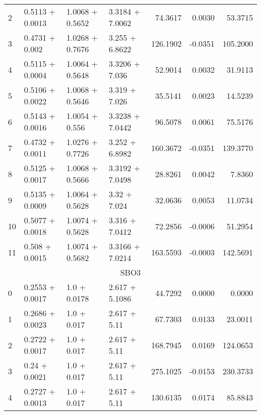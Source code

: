 \begin{tabular}{llllrrr}
  2  &  0.5113 + 0.0013 &  1.0068 + 0.5652 &  3.3184 + 7.0062 &             74.3617 &                 0.0030 &        53.3715 \\
  3  &   0.4731 + 0.002 &  1.0268 + 0.7676 &   3.255 + 6.8622 &            126.1902 &                -0.0351 &       105.2000 \\
  4  &  0.5115 + 0.0004 &  1.0064 + 0.5648 &   3.3206 + 7.036 &             52.9014 &                 0.0032 &        31.9113 \\
  5  &  0.5106 + 0.0022 &  1.0068 + 0.5646 &    3.319 + 7.026 &             35.5141 &                 0.0023 &        14.5239 \\
  6  &  0.5143 + 0.0016 &   1.0054 + 0.556 &  3.3238 + 7.0442 &             96.5078 &                 0.0061 &        75.5176 \\
  7  &  0.4732 + 0.0011 &  1.0276 + 0.7726 &   3.252 + 6.8982 &            160.3672 &                -0.0351 &       139.3770 \\
  8  &  0.5125 + 0.0017 &  1.0068 + 0.5666 &  3.3192 + 7.0498 &             28.8261 &                 0.0042 &         7.8360 \\
  9  &  0.5135 + 0.0009 &  1.0064 + 0.5628 &     3.32 + 7.024 &             32.0636 &                 0.0053 &        11.0734 \\
  10 &  0.5077 + 0.0018 &  1.0074 + 0.5628 &   3.316 + 7.0412 &             72.2856 &                -0.0006 &        51.2954 \\
  11 &   0.508 + 0.0015 &  1.0074 + 0.5682 &  3.3166 + 7.0214 &            163.5593 &                -0.0003 &       142.5691 \\
  \midrule
  \multicolumn{7}{c}{SBO3} \\
  \midrule
  0  &  0.2553 + 0.0017 &  1.0 + 0.0178 &  2.617 + 5.1086 &             44.7292 &                 0.0000 &         0.0000 \\
  1  &  0.2686 + 0.0023 &   1.0 + 0.017 &    2.617 + 5.11 &             67.7303 &                 0.0133 &        23.0011 \\
  2  &  0.2722 + 0.0017 &   1.0 + 0.017 &    2.617 + 5.11 &            168.7945 &                 0.0169 &       124.0653 \\
  3  &    0.24 + 0.0021 &   1.0 + 0.017 &    2.617 + 5.11 &            275.1025 &                -0.0153 &       230.3733 \\
  4  &  0.2727 + 0.0013 &   1.0 + 0.017 &    2.617 + 5.11 &            130.6135 &                 0.0174 &        85.8843 \\

\end{tabular}
